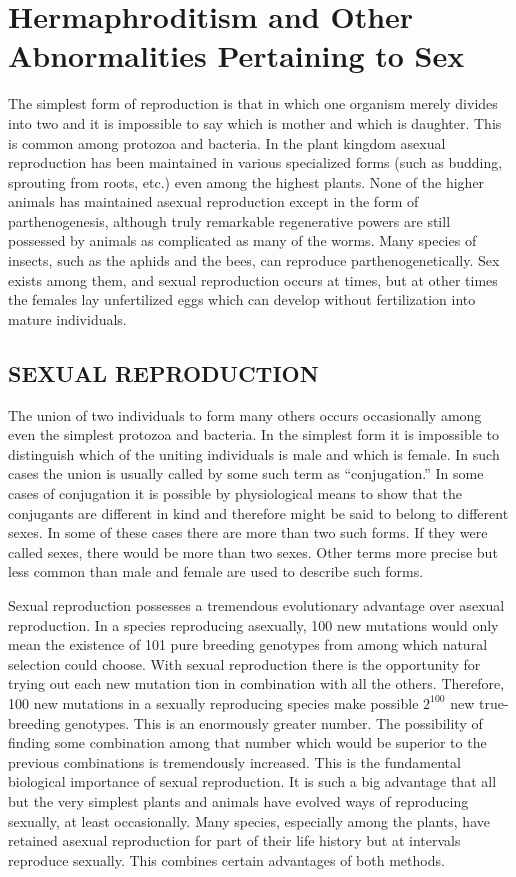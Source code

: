 \chapter[Hermaphroditism and Other Abnormalities]{Hermaphroditism and Other Abnormalities Pertaining to Sex}
\label{cha:Lush_Chapter_35}

The simplest form of reproduction is that in which one organism
merely divides into two and it is impossible to say which is mother and
which is daughter. This is common among protozoa and bacteria. In
the plant kingdom asexual reproduction has been maintained in various
specialized forms (such as budding, sprouting from roots, etc.) even
among the highest plants. None of the higher animals has maintained
asexual reproduction except in the form of parthenogenesis, although
truly remarkable regenerative powers are still possessed by animals as
complicated as many of the worms. Many species of insects, such as the
aphids and the bees, can reproduce parthenogenetically. Sex exists
among them, and sexual reproduction occurs at times, but at other
times the females lay unfertilized eggs which can develop without fertilization
into mature individuals.

\section*{SEXUAL REPRODUCTION}

The union of two individuals to form many others occurs occasionally
among even the simplest protozoa and bacteria. In the simplest
form it is impossible to distinguish which of the uniting individuals is
male and which is female. In such cases the union is usually called by
some such term as ``conjugation.'' In some cases of conjugation it is possible
by physiological means to show that the conjugants are different
in kind and therefore might be said to belong to different sexes. In
some of these cases there are more than two such forms. If they were
called sexes, there would be more than two sexes. Other terms more
precise but less common than male and female are used to describe
such forms.

Sexual reproduction possesses a tremendous evolutionary advantage
over asexual reproduction. In a species reproducing asexually, 100
new mutations would only mean the existence of 101 pure breeding
genotypes from among which natural selection could choose. With sexual
reproduction there is the opportunity for trying out each new mutation
tion in combination with all the others. Therefore, 100 new mutations
in a sexually reproducing species make possible $2^{100}$ new true-breeding
genotypes. This is an enormously greater number. The possibility of
finding some combination among that number which would be superior
to the previous combinations is tremendously increased. This is the
fundamental biological importance of sexual reproduction. It is such a
big advantage that all but the very simplest plants and animals have
evolved ways of reproducing sexually, at least occasionally. Many species,
especially among the plants, have retained asexual reproduction
for part of their life history but at intervals reproduce sexually. This
combines certain advantages of both methods.

